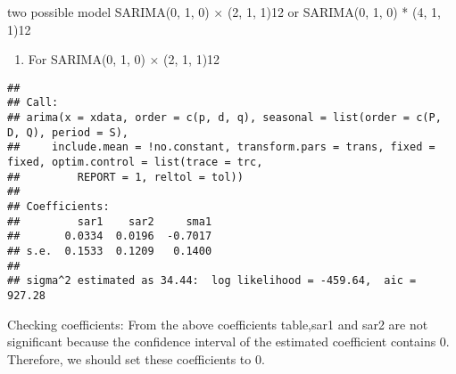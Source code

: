 \documentclass[
]{article}
\newenvironment{Shaded}{\begin{snugshade}}{\end{snugshade}}
\newcommand{\AttributeTok}[1]{\textcolor[rgb]{0.13,0.29,0.53}{#1}}
\newcommand{\CommentTok}[1]{\textcolor[rgb]{0.56,0.35,0.01}{\textit{#1}}}
\newcommand{\ConstantTok}[1]{\textcolor[rgb]{0.56,0.35,0.01}{#1}}
\newcommand{\DecValTok}[1]{\textcolor[rgb]{0.00,0.00,0.81}{#1}}
\newcommand{\FunctionTok}[1]{\textcolor[rgb]{0.13,0.29,0.53}{\textbf{#1}}}
\newcommand{\NormalTok}[1]{#1}
\newcommand{\OtherTok}[1]{\textcolor[rgb]{0.56,0.35,0.01}{#1}}
\newcommand{\SpecialCharTok}[1]{\textcolor[rgb]{0.81,0.36,0.00}{\textbf{#1}}}
\providecommand{\tightlist}{%
  \setlength{\itemsep}{0pt}\setlength{\parskip}{0pt}}
\begin{document}
two possible model SARIMA(0, 1, 0) × (2, 1, 1)12 or SARIMA(0, 1, 0) *
(4, 1, 1)12

\begin{enumerate}
\def\labelenumi{(\alph{enumi})}
\setcounter{enumi}{3}
\tightlist
\item
  For SARIMA(0, 1, 0) × (2, 1, 1)12
\end{enumerate}

\begin{Shaded}
\end{Shaded}

\begin{verbatim}
## 
## Call:
## arima(x = xdata, order = c(p, d, q), seasonal = list(order = c(P, D, Q), period = S), 
##     include.mean = !no.constant, transform.pars = trans, fixed = fixed, optim.control = list(trace = trc, 
##         REPORT = 1, reltol = tol))
## 
## Coefficients:
##         sar1    sar2     sma1
##       0.0334  0.0196  -0.7017
## s.e.  0.1533  0.1209   0.1400
## 
## sigma^2 estimated as 34.44:  log likelihood = -459.64,  aic = 927.28
\end{verbatim}

Checking coefficients: From the above coefficients table,sar1 and sar2
are not significant because the confidence interval of the estimated
coefficient contains 0. Therefore, we should set these coefficients to
0.

\begin{Shaded}
\end{Shaded}
\end{document}
